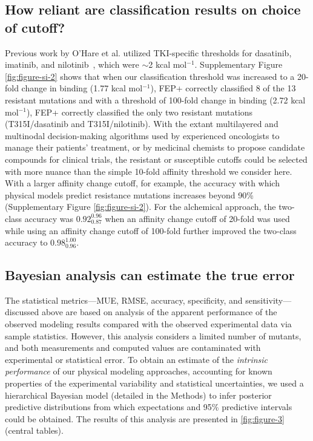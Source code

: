 \documentclass[phd,tocprelim]{cornell}
\renewcommand{\FIG}[1]{\autoref{fig:#1}}
\begin{document}
\subsection{How reliant are classification results on choice of cutoff?}
Previous work by O'Hare et al. utilized TKI-specific thresholds for dasatinib, imatinib, and nilotinib~\citep{OHare:Clin.CancerRes.:2005}, which were $\sim$2 kcal mol$^{-1}$.
Supplementary Figure \ref{fig:figure-si-2} shows that when our classification threshold was increased to a 20-fold change in binding (1.77 kcal mol$^{-1}$), FEP+ correctly classified 8 of the 13 resistant mutations and with a threshold of 100-fold change in binding (2.72 kcal mol$^{-1}$), FEP+ correctly classified the only two resistant mutations (T315I/dasatinib and T315I/nilotinib).
With the extant multilayered and multinodal decision-making algorithms used by experienced oncologists to manage their patients' treatment, or by medicinal chemists to propose candidate compounds for clinical trials, the resistant or susceptible cutoffs could be selected with more nuance than the simple 10-fold affinity threshold we consider here.
With a larger affinity change cutoff, for example, the accuracy with which physical models predict resistance mutations increases beyond 90\% (Supplementary Figure \ref{fig:figure-si-2}).
For the alchemical approach, the two-class accuracy was $0.92^{0.96}_{0.87}$ when an affinity change cutoff of 20-fold was used while using an affinity change cutoff of 100-fold further improved the two-class accuracy to $0.98^{1.00}_{0.96}$.

\subsection{Bayesian analysis can estimate the true error}
The statistical metrics---MUE, RMSE, accuracy, specificity, and sensitivity---discussed above are based on analysis of the apparent performance of the observed modeling results compared with the observed experimental data via sample statistics.
However, this analysis considers a limited number of mutants, and both measurements and computed values are contaminated with experimental or statistical error. 
To obtain an estimate of the \emph{intrinsic performance} of our physical modeling approaches, accounting for known properties of the experimental variability and statistical uncertainties, we used a hierarchical Bayesian model (detailed in the Methods) to infer posterior predictive distributions from which expectations and 95\% predictive intervals could be obtained.
The results of this analysis are presented in \FIG{figure-3} (central tables). 
\end{document}
